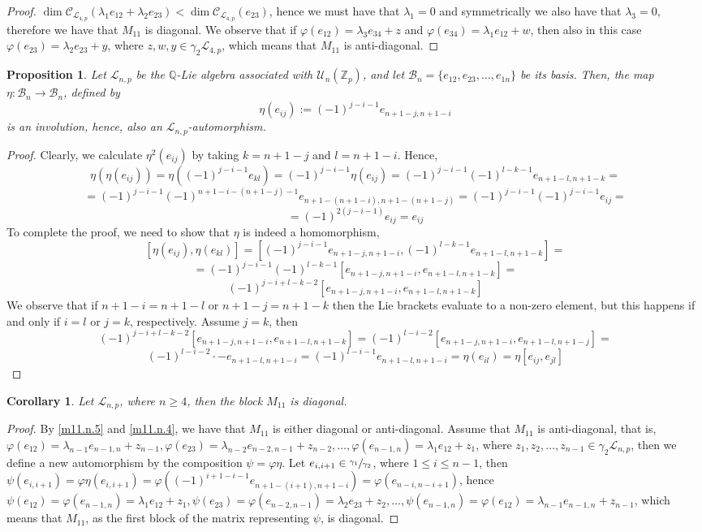 \documentclass[12pt]{article}
\newtheorem{proposition}[theorem]{Proposition}
\newtheorem{corollary}[theorem]{Corollary}
\begin{document}
\begin{proof}
$\dim\mathcal{C}_{\mathcal{L}_{4,p}}(\lambda_1 e_{12}+\lambda_2 e_{23})<\dim\mathcal{C}_{\mathcal{L}_{4,p}}(e_{23})$, hence we must have that $\lambda_1=0$ and symmetrically we also have that $\lambda_3=0$, therefore we have that $M_{11}$ is diagonal. We observe that if $\varphi(e_{12})=\lambda_3 e_{34}+z$ and $\varphi(e_{34})=\lambda_1 e_{12}+w$, then also in this case $\varphi(e_{23})=\lambda_2 e_{23}+y$, where $z,w,y\in\gamma_2\mathcal{L}_{4,p}$, which means that $M_{11}$ is anti-diagonal.
\end{proof}
\begin{proposition}
\label{prop.involution}
Let $\mathcal{L}_{n,p}$ be the $\mathbb{Q}$-Lie algebra associated with $\mathcal{U}_n(\mathbb{Z}_p)$, and let $\mathcal{B}_n=\{e_{12},e_{23},\dots,e_{1n}\}$ be its basis. Then, the map $\eta:\mathcal{B}_n\rightarrow \mathcal{B}_n$, defined by \[\eta(e_{ij}):=(-1)^{j-i-1}e_{n+1-j,n+1-i}\] is an involution, hence, also an $\mathcal{L}_{n,p}$-automorphism.
\end{proposition}
\begin{proof}
Clearly, we calculate $\eta^2(e_{ij})$ by taking $k=n+1-j$ and $l=n+1-i$. Hence, \[\eta(\eta(e_{ij}))=\eta((-1)^{j-i-1}e_{kl})=(-1)^{j-i-1}\eta(e_{ij})=(-1)^{j-i-1}(-1)^{l-k-1}e_{n+1-l,n+1-k}=\]\[=(-1)^{j-i-1}(-1)^{n+1-i-(n+1-j)-1}e_{n+1-(n+1-i),n+1-(n+1-j)}=(-1)^{j-i-1}(-1)^{j-i-1}e_{ij}=\]\[=(-1)^{2(j-i-1)}e_{ij}=e_{ij}\]
To complete the proof, we need to show that $\eta$ is indeed a homomorphism,
\[[\eta(e_{ij}),\eta(e_{kl})]=[(-1)^{j-i-1}e_{n+1-j,n+1-i},(-1)^{l-k-1}e_{n+1-l,n+1-k}]=\]\[=(-1)^{j-i-1}(-1)^{l-k-1}[e_{n+1-j,n+1-i},e_{n+1-l,n+1-k}]=\]\[(-1)^{j-i+l-k-2}[e_{n+1-j,n+1-i},e_{n+1-l,n+1-k}]\]
We observe that if $n+1-i=n+1-l$ or $n+1-j=n+1-k$ then the Lie brackets evaluate to a non-zero element, but this happens if and only if $i=l$ or $j=k$, respectively. Assume $j=k$, then \[(-1)^{j-i+l-k-2}[e_{n+1-j,n+1-i},e_{n+1-l,n+1-k}]=(-1)^{l-i-2}[e_{n+1-j,n+1-i},e_{n+1-l,n+1-j}]=\]\[(-1)^{l-i-2}\cdot-e_{n+1-l,n+1-i}=(-1)^{l-i-1}e_{n+1-l,n+1-i}=\eta(e_{il})=\eta[e_{ij},e_{jl}]\] 
\end{proof}
\begin{corollary}
\label{m11.diagonal}
Let $\mathcal{L}_{n,p}$, where $n\geq 4$, then the block $M_{11}$ is diagonal.
\end{corollary}
\begin{proof}
By \ref{m11.n.5} and \ref{m11.n.4}, we have that $M_{11}$ is either diagonal or anti-diagonal. Assume that $M_{11}$ is anti-diagonal, that is, $\varphi(e_{12})=\lambda_{n-1}e_{n-1,n}+z_{n-1},\varphi(e_{23})=\lambda_{n-2} e_{n-2,n-1}+z_{n-2},\dots,\varphi(e_{n-1,n})=\lambda_1 e_{12}+z_1$, where $z_1,z_2,\dots,z_{n-1}\in\gamma_2\mathcal{L}_{n,p}$, then we define a new automorphism by the composition $\psi=\varphi\eta$. Let $e_{i,i+1}\in\sfrac{\gamma_1}{\gamma_2}$, where $1\leq i\leq n-1$, then $\psi(e_{i,i+1})=\varphi\eta(e_{i,i+1})=\varphi((-1)^{i+1-i-1}e_{n+1-(i+1),n+1-i})=\varphi(e_{n-i,n-i+1})
$, hence $\psi(e_{12})=\varphi(e_{n-1,n})=\lambda_1 e_{12}+z_1,\psi(e_{23})=\varphi(e_{n-2,n-1})=\lambda_2 e_{23}+z_2,\dots,\psi(e_{n-1,n})=\varphi(e_{12})=\lambda_{n-1}e_{n-1,n}+z_{n-1}$, which means that $M_{11}$, as the first block of the matrix representing $\psi$, is diagonal.  
\end{proof}
\end{document}
